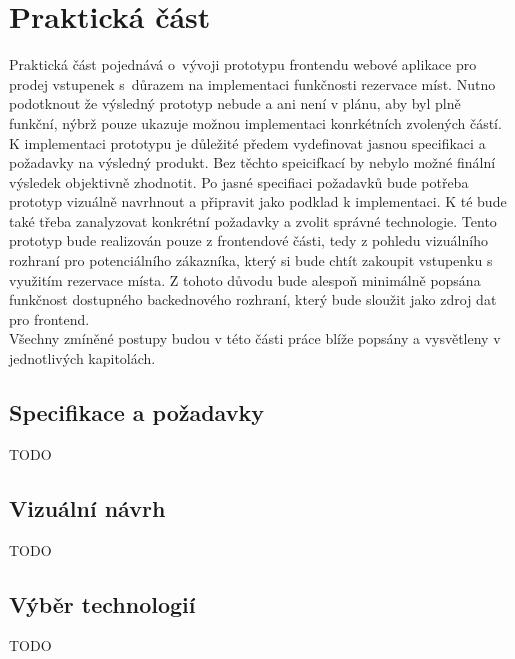 \chapter{Praktická část}

Praktická část pojednává o~vývoji prototypu frontendu webové aplikace pro prodej vstupenek s~důrazem na implementaci funkčnosti rezervace míst. Nutno podotknout že výsledný prototyp nebude a ani není v plánu, aby byl plně funkční, nýbrž pouze ukazuje možnou implementaci konrkétních zvolených částí.\\

K implementaci prototypu je důležité předem vydefinovat jasnou specifikaci a požadavky na výsledný produkt. Bez těchto speicifkací by nebylo možné finální výsledek objektivně zhodnotit. Po jasné specifiaci požadavků bude potřeba prototyp vizuálně navrhnout a připravit jako podklad k implementaci. K té bude také třeba zanalyzovat konkrétní požadavky a zvolit správné technologie. Tento prototyp bude realizován pouze z frontendové části, tedy z pohledu vizuálního rozhraní pro potenciálního zákazníka, který si bude chtít zakoupit vstupenku s využitím rezervace místa. Z tohoto důvodu bude alespoň minimálně popsána funkčnost dostupného backednového rozhraní, který bude sloužit jako zdroj dat pro frontend.\\

Všechny zmíněné postupy budou v této části práce blíže popsány a vysvětleny v jednotlivých kapitolách.

\section{Specifikace a požadavky}
\label{sec:specifikace}
TODO

\section{Vizuální návrh}
\label{sec:navrh}
TODO

\section{Výběr technologií}
\label{sec:technologie}
TODO
